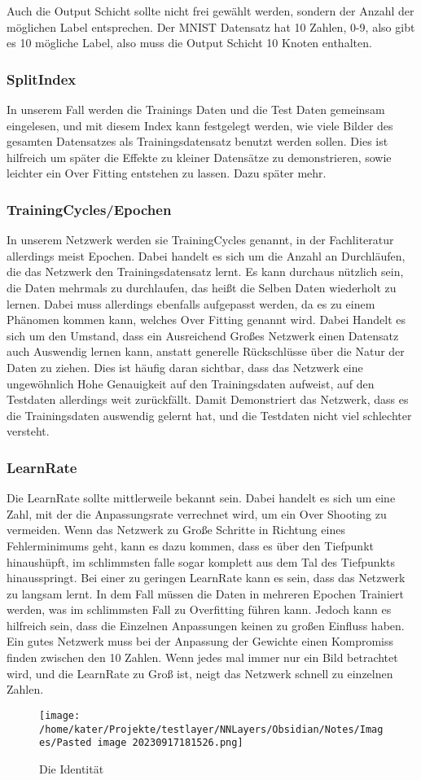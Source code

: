 \documentclass[12pt]{article}
\begin{document}
Auch die Output Schicht sollte nicht frei gewählt werden, sondern der Anzahl der möglichen Label entsprechen. Der MNIST Datensatz hat 10 Zahlen, 0-9, also gibt es 10 mögliche Label, also muss die Output Schicht 10 Knoten enthalten.\subsubsection{ SplitIndex}In unserem Fall werden die Trainings Daten und die Test Daten gemeinsam eingelesen, und mit diesem Index kann festgelegt werden, wie viele Bilder des gesamten Datensatzes als Trainingsdatensatz benutzt werden sollen. Dies ist hilfreich um später die Effekte zu kleiner Datensätze zu demonstrieren, sowie leichter ein Over Fitting entstehen zu lassen. Dazu später mehr.\subsubsection{ TrainingCycles/Epochen}In unserem Netzwerk werden sie TrainingCycles genannt, in der Fachliteratur allerdings meist Epochen. Dabei handelt es sich um die Anzahl an Durchläufen, die das Netzwerk den Trainingsdatensatz lernt. Es kann durchaus nützlich sein, die Daten mehrmals zu durchlaufen, das heißt die Selben Daten wiederholt zu lernen. Dabei muss allerdings ebenfalls aufgepasst werden, da es zu einem Phänomen kommen kann, welches Over Fitting genannt wird. Dabei Handelt es sich um den Umstand, dass ein Ausreichend Großes Netzwerk einen Datensatz auch Auswendig lernen kann, anstatt generelle Rückschlüsse über die Natur der Daten zu ziehen. Dies ist häufig daran sichtbar, dass das Netzwerk eine ungewöhnlich Hohe Genauigkeit auf den Trainingsdaten aufweist, auf den Testdaten allerdings weit zurückfällt. Damit Demonstriert das Netzwerk, dass es die Trainingsdaten auswendig gelernt hat, und die Testdaten nicht viel schlechter versteht. \subsubsection{ LearnRate}Die LearnRate sollte mittlerweile bekannt sein. Dabei handelt es sich um eine Zahl, mit der die Anpassungsrate verrechnet wird, um ein Over Shooting zu vermeiden. Wenn das Netzwerk zu Große Schritte in Richtung eines Fehlerminimums geht, kann es dazu kommen, dass es über den Tiefpunkt hinaushüpft, im schlimmsten falle sogar komplett aus dem Tal des Tiefpunkts hinausspringt. Bei einer zu geringen LearnRate kann es sein, dass das Netzwerk zu langsam lernt. In dem Fall müssen die Daten in mehreren Epochen Trainiert werden, was im schlimmsten Fall zu Overfitting führen kann. Jedoch kann es hilfreich sein, dass die Einzelnen Anpassungen keinen zu großen Einfluss haben. Ein gutes Netzwerk muss bei der Anpassung der Gewichte einen Kompromiss finden zwischen den 10 Zahlen. Wenn jedes mal immer nur ein Bild betrachtet wird, und die LearnRate zu Groß ist, neigt das Netzwerk schnell zu einzelnen Zahlen.\begin{figure}[H]
\centering
\texttt{[image: /home/kater/Projekte/testlayer/NNLayers/Obsidian/Notes/Images/Pasted image 20230917181526.png]}
\caption{Die Identität}
\label{Was kommt hier rein?}\end{figure}
\end{document}
